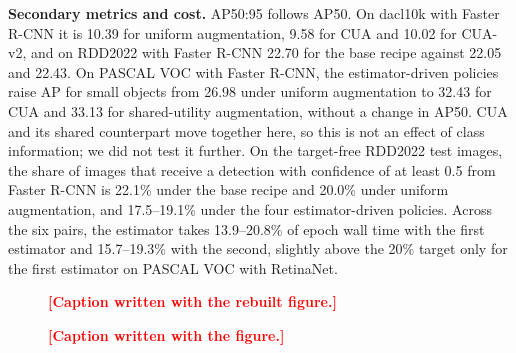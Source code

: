 \documentclass[conference]{IEEEtran}
\newcommand{\todo}[1]{\textcolor{red}{\textbf{[#1]}}}
\begin{document}
\noindent\textbf{Secondary metrics and cost.} AP50:95 follows AP50. On dacl10k with Faster R-CNN it is 10.39 for uniform augmentation, 9.58 for CUA and 10.02 for CUA-v2, and on RDD2022 with Faster R-CNN 22.70 for the base recipe against 22.05 and 22.43. On PASCAL VOC with Faster R-CNN, the estimator-driven policies raise AP for small objects from 26.98 under uniform augmentation to 32.43 for CUA and 33.13 for shared-utility augmentation, without a change in AP50. CUA and its shared counterpart move together here, so this is not an effect of class information; we did not test it further. On the target-free RDD2022 test images, the share of images that receive a detection with confidence of at least 0.5 from Faster R-CNN is 22.1\% under the base recipe and 20.0\% under uniform augmentation, and 17.5--19.1\% under the four estimator-driven policies. Across the six pairs, the estimator takes 13.9--20.8\% of epoch wall time with the first estimator and 15.7--19.3\% with the second, slightly above the 20\% target only for the first estimator on PASCAL VOC with RetinaNet.

\begin{figure}[t]
\centering
{}
\caption{\todo{Caption written with the rebuilt figure.}}
\label{fig:forest}
\end{figure}

\begin{figure}[t]
\centering
{}
\caption{\todo{Caption written with the figure.}}
\label{fig:agreement}
\end{figure}
\end{document}
